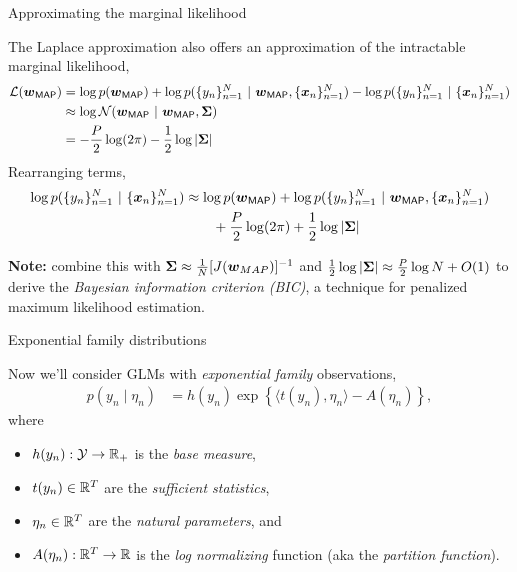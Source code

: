 \documentclass[aspectratio=169]{beamer}
\begin{document}
\begin{frame}{Approximating the marginal likelihood}

The Laplace approximation also offers an approximation of the intractable marginal likelihood,
\begin{align}
    \mathcal{L}(\boldsymbol{w}_{\mathsf{MAP}}) &= 
    \log p(\boldsymbol{w}_{\mathsf{MAP}}) + \log p(\{y_n\}_{n=1}^N ~\vert~ \boldsymbol{w}_{\mathsf{MAP}}, \{\boldsymbol{x}_n\}_{n=1}^N) - \log p(\{y_n\}_{n=1}^N ~\vert~ \{\boldsymbol{x}_n\}_{n=1}^N) \\
    & \approx \log \mathcal{N}(\boldsymbol{w}_{\mathsf{MAP}} ~\vert~ \boldsymbol{w}_{\mathsf{MAP}}, \boldsymbol{\Sigma}) \\
    &= -\frac{P}{2} \log (2 \pi) - \frac{1}{2} \log |\boldsymbol{\Sigma}|
\end{align}
Rearranging terms,
\begin{align}
    \nonumber
    \log p(\{y_n\}_{n=1}^N ~\vert~ \{\boldsymbol{x}_n\}_{n=1}^N) 
    &\approx \log p(\boldsymbol{w}_{\mathsf{MAP}}) + \log p(\{y_n\}_{n=1}^N ~\vert~ \boldsymbol{w}_{\mathsf{MAP}}, \{\boldsymbol{x}_n\}_{n=1}^N) \\
    &\qquad + \frac{P}{2} \log (2 \pi) + \frac{1}{2} \log |\boldsymbol{\Sigma}|
\end{align}

\textbf{Note:} combine this with $\boldsymbol{\Sigma} \approx \tfrac{1}{N} [J(\boldsymbol{w}_{MAP})]^{-1}$ and $\tfrac{1}{2} \log |\boldsymbol{\Sigma}| \approx \tfrac{P}{2} \log N + O(1)$ to derive the \emph{Bayesian information criterion (BIC)}, a technique for penalized maximum likelihood estimation.
\end{frame}

\begin{frame}{Exponential family distributions}
    
    Now we'll consider GLMs with \emph{exponential family} observations,
    \begin{align}
        p(y_n \mid \eta_n) &= h(y_n) \exp \left \{\langle t(y_n), \eta_n \rangle - A(\eta_n) \right\},
    \end{align}
    where 
    \begin{itemize}
        \item $h(y_n): \mathcal{Y} \to \mathbb{R}_+$ is the \emph{base measure},
        \item $t(y_n) \in \mathbb{R}^T$ are the \textit{sufficient statistics},
        \item $\eta_n \in \mathbb{R}^T$ are the \textit{natural parameters}, and
        \item $A(\eta_n): \mathbb{R}^T \to \mathbb{R}$ is the \textit{log normalizing} function (aka the \emph{partition function}).
    \end{itemize}
    
\end{frame}
\end{document}
